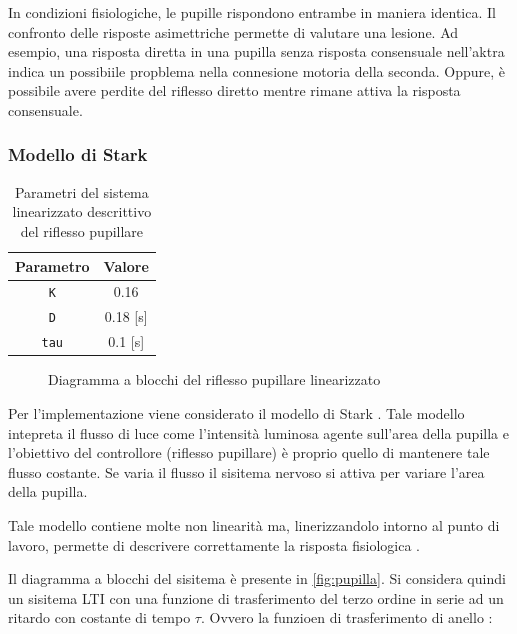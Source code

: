 In condizioni fisiologiche, le pupille rispondono entrambe in maniera identica. Il confronto delle risposte asimettriche permette di valutare una lesione.
Ad esempio, una risposta diretta in una pupilla senza risposta consensuale nell'aktra indica un possibiile propblema nella connesione motoria della seconda. Oppure, è possibile avere perdite del riflesso diretto mentre rimane attiva la risposta consensuale. 

\subsubsection{Modello di Stark}

\begin{table}[t!]
	\centering
	\begin{tabular}{|c|c|}
		\hline
		Parametro & Valore \\
		\hline
		\texttt{K} & 0.16 \\
		\hline
		\texttt{D} & 0.18 [s] \\
		\hline
		\texttt{tau} & 0.1 [s] \\
		\hline
	\end{tabular}
	\caption{Parametri del sistema linearizzato descrittivo del riflesso pupillare}
	\label{tab:pupilla}
\end{table}



\begin{figure}[b!]
	\centering
	\footnotesize{\def\svgwidth{0.95\linewidth}
		}
	\caption{Diagramma a blocchi del riflesso pupillare linearizzato}
\end{figure}

Per l'implementazione viene considerato il modello di Stark \cite{stark_servoanalytic_1957}. Tale modello intepreta il flusso di luce come l'intensità luminosa agente sull'area della pupilla e l'obiettivo del controllore (riflesso pupillare) è proprio quello di mantenere tale flusso costante. Se varia il flusso il sisitema nervoso si attiva per variare l'area della pupilla.

Tale modello contiene molte non linearità ma, linerizzandolo intorno al punto di lavoro, permette di descrivere correttamente la risposta fisiologica \cite{khoo_physiological_2018}.

Il diagramma a blocchi del sisitema è presente in \cref{fig:pupilla}. Si considera quindi un sisitema LTI con una funzione di trasferimento del terzo ordine in serie ad un ritardo con costante di tempo $\tau$. Ovvero la funzioen di trasferimento di anello :

